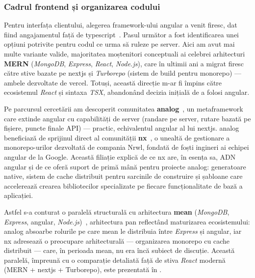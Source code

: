 \subsubsection*{Cadrul frontend și organizarea codului}

Pentru interfața clientului, alegerea framework-ului \gls{angular} a venit firesc, dat fiind angajamentul față de \gls{typescript}~\cite{angular_signals}.
Pasul următor a fost identificarea unei opțiuni potrivite pentru codul ce urma să ruleze pe server.
Aici am avut mai multe variante valide, majoritatea moștenitori conceptuali ai celebrei arhitecturi \textbf{MERN} (\textit{MongoDB}, \textit{Express}, \textit{React}, \textit{Node.js}), care în ultimii ani a migrat firesc către stive bazate pe \gls{nextjs} și \textit{Turborepo} (sistem de build pentru \gls{monorepo}) --- ambele dezvoltate de \gls{vercel}.
Totuși, această direcție m-ar fi împins către ecosistemul \textit{React} și sintaxa \textit{TSX}, abandonând decizia inițială de a folosi \gls{angular}.

Pe parcursul cercetării am descoperit comunitatea \textbf{\gls{analog}}~\cite{analog}, un \gls{metaframework} care extinde \gls{angular} cu capabilități de server (randare pe server, rutare bazată pe fișiere, puncte finale API) --- practic, echivalentul \gls{angular} al lui \gls{nextjs}.
\gls{analog} beneficiază de sprijinul direct al comunității \textbf{\gls{nx}}~\cite{nx}, o unealtă de gestionare a \gls{monorepo}-urilor dezvoltată de compania Nrwl, fondată de foști ingineri ai echipei \gls{angular} de la Google.
Această filiație explică de ce \gls{nx} are, în esența sa, ADN \gls{angular} și de ce oferă suport de primă mână pentru proiecte \gls{analog}: generatoare native, sistem de cache distribuit pentru sarcinile de construire și șabloane care accelerează crearea bibliotecilor specializate pe fiecare funcționalitate de bază a aplicației.

Astfel s-a conturat o paralelă structurală cu arhitectura \textbf{\gls{mean}} (\textit{MongoDB}, \textit{Express}, \gls{angular}, \textit{Node.js})~\cite{karpovMean2013}, arhitectura \gls{pan} reflectând maturizarea ecosistemului: \gls{analog} absoarbe rolurile pe care \gls{mean} le distribuia între \textit{Express} și \gls{angular}, iar \gls{nx} adresează o preocupare arhitecturală --- organizarea \gls{monorepo} cu cache distribuit --- care, în perioada \gls{mean}, nu era încă subiect de discuție.
Această paralelă, împreună cu o comparație detaliată față de stiva \textit{React} modernă (MERN + \gls{nextjs} + Turborepo), este prezentată în .

